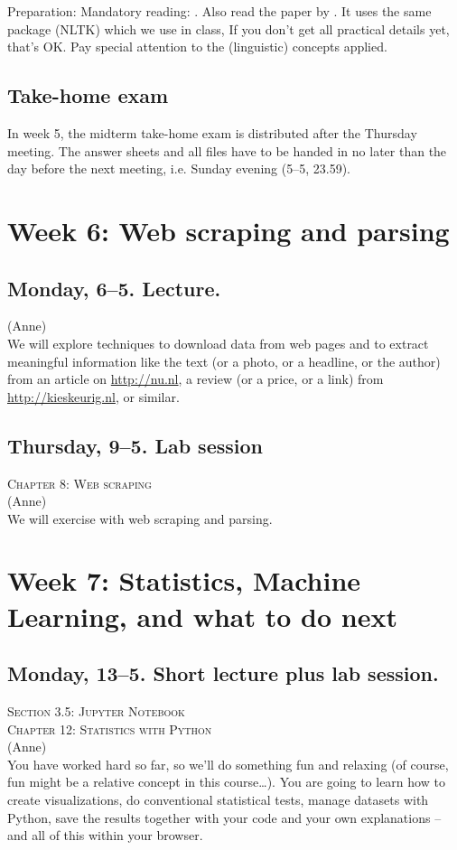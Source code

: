 \documentclass[a4paper,10pt]{report}
\begin{document}
Preparation: Mandatory reading: \citealp{Boumans2016}. Also read the paper by \cite{Madnani}. It uses the same package (NLTK) which we use in class, If you don’t get all practical details yet, that’s OK. Pay special attention to the (linguistic) concepts applied.  

\subsection*{Take-home exam}
In week 5, the midterm take-home exam is distributed after the Thursday meeting. The answer sheets and all files have to be handed in no later than the day before the next meeting, i.e. Sunday evening (5--5, 23.59).



\section*{Week 6: Web scraping and parsing}

\subsection*{Monday, 6--5. Lecture.}
{\footnotesize{(Anne)}\\}
We will explore techniques to download data from web pages and to extract meaningful information like the text (or a photo, or a headline, or the author) from an article on \url{http://nu.nl}, a review (or a price, or a link) from \url{http://kieskeurig.nl}, or similar. 

\subsection*{Thursday, 9--5. Lab session}
\textsc{ Chapter 8: Web scraping}\\
{\footnotesize{(Anne)}\\}
We will exercise with web scraping and parsing.

\section*{Week 7: Statistics, Machine Learning, and what to do next}

\subsection*{Monday, 13--5. Short lecture plus lab session.}
\textsc{ Section 3.5: Jupyter Notebook}\\
\textsc{ Chapter 12: Statistics with Python}\\
{\footnotesize{(Anne)}\\}
You have worked hard so far, so we'll do something fun and relaxing (of course, fun might be a relative concept in this course\ldots). You are going to learn how to create visualizations, do conventional statistical tests, manage datasets with Python, save the results together with your code and your own explanations -- and all of this within your browser.
\end{document}
